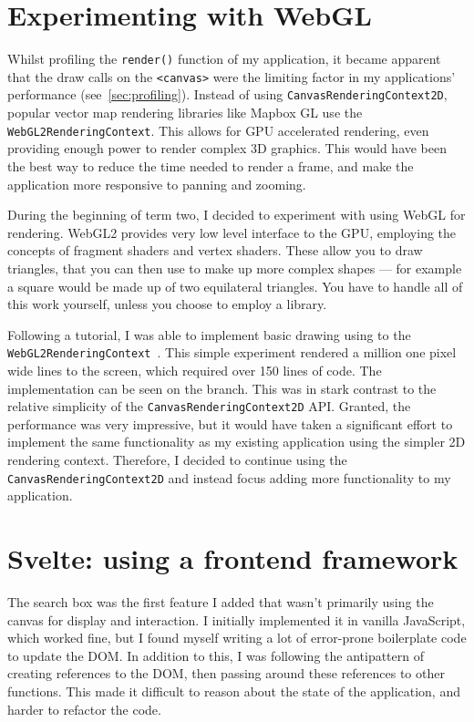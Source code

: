 \documentclass[hyphens]{final_report}
\begin{document}
\section{Experimenting with WebGL}\label{sec:webgl}

Whilst profiling the \texttt{render()} function of my application, it became apparent that the draw calls on the \texttt{<canvas>} were the limiting factor in my applications' performance (see~\ref{sec:profiling}). Instead of using \texttt{CanvasRenderingContext2D}, popular vector map rendering libraries like Mapbox GL use the \texttt{WebGL2RenderingContext}. This allows for GPU accelerated rendering, even providing enough power to render complex 3D graphics. This would have been the best way to reduce the time needed to render a frame, and make the application more responsive to panning and zooming.

During the beginning of term two, I decided to experiment with using WebGL for rendering. WebGL2 provides very low level interface to the GPU, employing the concepts of fragment shaders and vertex shaders. These allow you to draw triangles, that you can then use to make up more complex shapes --- for example a square would be made up of two equilateral triangles. You have to handle all of this work yourself, unless you choose to employ a library.

Following a tutorial, I was able to implement basic drawing using to the \texttt{WebGL2\-Rendering\-Context}~\cite{webgl2fundamentals}. This simple experiment rendered a million one pixel wide lines to the screen, which required over 150 lines of code. The implementation can be seen on the \href{https://gitlab.cim.rhul.ac.uk/zhac152/PROJECT/-/blob/feat/web-gl/final-deliverable/src/map/map.ts#L87}{} branch. This was in stark contrast to the relative simplicity of the \texttt{CanvasRenderingContext2D} API\@. Granted, the performance was very impressive, but it would have taken a significant effort to implement the same functionality as my existing application using the simpler 2D rendering context. Therefore, I decided to continue using the \texttt{CanvasRenderingContext2D} and instead focus adding more functionality to my application.

\section{Svelte: using a frontend framework}\label{sec:svelte}

The search box was the first feature I added that wasn't primarily using the canvas for display and interaction. I initially implemented it in vanilla JavaScript, which worked fine, but I found myself writing a lot of error-prone boilerplate code to update the DOM\@. In addition to this, I was following the antipattern of creating references to the DOM, then passing around these references to other functions. This made it difficult to reason about the state of the application, and harder to refactor the code.
\end{document}
